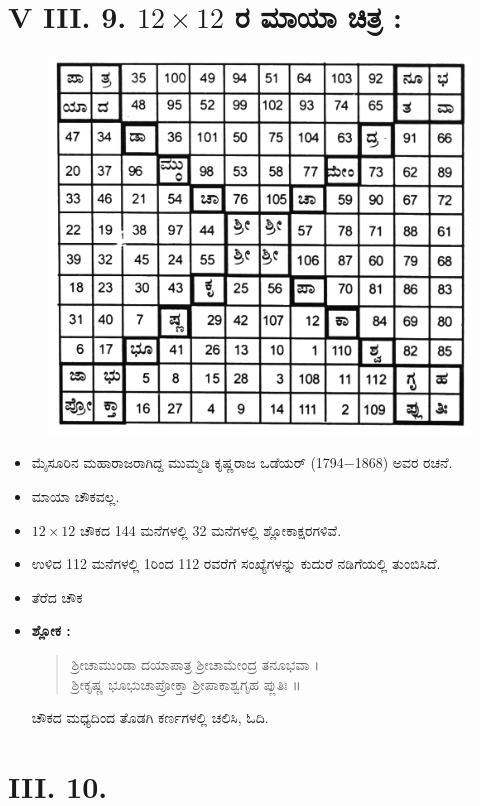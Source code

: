 \section*{V III. 9. $12 \times 12$ ರ ಮಾಯಾ ಚಿತ್ರ :}
\begin{figure}[H]
\includegraphics{src/figures/chap6/fig6-12.jpg}
\end{figure}

\begin{itemize}
	\item ಮೈಸೂರಿನ ಮಹಾರಾಜರಾಗಿದ್ದ ಮುಮ್ಮಡಿ ಕೃಷ್ಣರಾಜ ಒಡೆಯರ್ (1794$-$1868) ಅವರ ರಚನೆ.
	\item ಮಾಯಾ ಚೌಕವಲ್ಲ.
	\item $12 \times 12$ ಚೌಕದ 144 ಮನೆಗಳಲ್ಲಿ 32 ಮನೆಗಳಲ್ಲಿ ಶ್ಲೋಕಾಕ್ಷರಗಳಿವೆ.
	\item ಉಳಿದ 112 ಮನೆಗಳಲ್ಲಿ 1ರಿಂದ 112 ರವರೆಗೆ ಸಂಖ್ಯೆಗಳನ್ನು ಕುದುರೆ ನಡಿಗೆಯಲ್ಲಿ ತುಂಬಿಸಿದೆ.
	\item ತೆರೆದ ಚೌಕ
	\item \textbf{ಶ್ಲೋಕ :} 
	\begin{quote}
	ಶ್ರೀಚಾಮುಂಡಾ ದಯಾಪಾತ್ರ ಶ್ರೀಚಾಮೇಂದ್ರ ತನೂಭವಾ ।\\
	ಶ್ರೀಕೃಷ್ಣ ಭೂಭುಚಾಪ್ರೋಕ್ತಾ ಶ್ರೀಪಾಕಾಶ್ವಗೃಹ ಪ್ಲುತಿಃ ॥
	\end{quote}
	ಚೌಕದ ಮಧ್ಯದಿಂದ ತೊಡಗಿ ಕರ್ಣಗಳಲ್ಲಿ ಚಲಿಸಿ, ಓದಿ.
\end{itemize}

\section*{ III. 10.}

